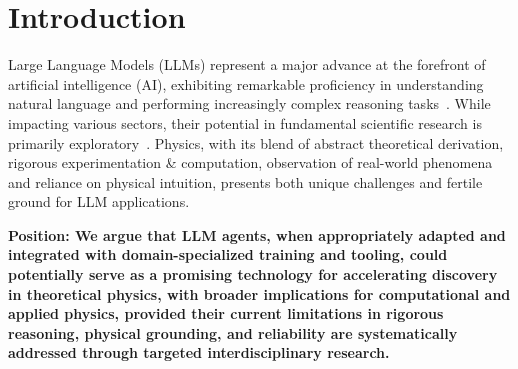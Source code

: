 \begin{abstract}
Large Language Models (LLMs) are rapidly advancing across diverse domains, yet their application in theoretical physics remains inadequate. While current models show competence in mathematical reasoning and code generation, we identify critical gaps in physical intuition, constraint satisfaction, and reliable reasoning that cannot be addressed through prompting alone. Physics demands approximation judgment, symmetry exploitation, and physical grounding that require AI agents specifically trained on physics reasoning patterns and equipped with physics-aware verification tools.
We argue that LLM would require such domain-specialized training and tooling to be useful in real-world for physics research.
We envision physics-specialized AI agents that seamlessly handle multimodal data, propose physically consistent hypotheses, and autonomously verify theoretical results. Realizing this vision requires developing physics-specific training datasets, reward signals that capture physical reasoning quality, and verification frameworks encoding fundamental principles. We call for collaborative efforts between physics and AI communities to build the specialized infrastructure necessary for AI-driven scientific discovery.
\end{abstract}

\section{Introduction}
\label{sec:introduction}
Large Language Models (LLMs) represent a major advance at the forefront of artificial intelligence (AI), exhibiting remarkable proficiency in understanding natural language and performing increasingly complex reasoning tasks~\cite{Brown2020Language,Radford2018Improving,OpenAI2023GPT4,Team2024Gemini,Team2024Geminia,Anthropic2024Claude}. While impacting various sectors, their potential in fundamental scientific research is primarily exploratory~\cite{Adesso2023Ultimate,Binz2025How}. Physics, with its blend of abstract theoretical derivation, rigorous experimentation \& computation, observation of real-world phenomena and reliance on physical intuition, presents both unique challenges and fertile ground for LLM applications.

\textbf{Position: We argue that LLM agents, when appropriately adapted and integrated with domain-specialized training and tooling, could potentially serve as a promising technology for accelerating discovery in theoretical physics, with broader implications for computational and applied physics, provided their current limitations in rigorous reasoning, physical grounding, and reliability are systematically addressed through targeted interdisciplinary research.}

